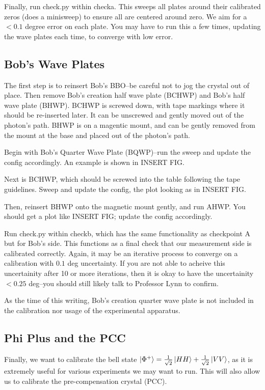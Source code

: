 \documentclass{paper}[11pt]
\begin{document}
Finally, run check.py within checka. This sweeps all plates around their calibrated zeros (does a minisweep) to ensure all are centered around zero. We aim for a $< 0.1$ degree error on each plate. You may have to run this a few times, updating the wave plates each time, to converge with low error. 

\subsection{Bob's Wave Plates}
The first step is to reinsert Bob's BBO--be careful not to jog the crystal out of place. Then remove Bob's creation half wave plate (BCHWP) and Bob's half wave plate (BHWP). BCHWP is screwed down, with tape markings where it should be re-inserted later. It can be unscrewed and gently moved out of the photon's path. BHWP is on a magentic mount, and can be gently removed from the mount at the base and placed out of the photon's path. 

Begin with Bob's Quarter Wave Plate (BQWP)--run the sweep and update the config accordingly. An example is shown in INSERT FIG. 

Next is BCHWP, which should be screwed into the table following the tape guidelines. Sweep and update the config, the plot looking as in INSERT FIG.

Then, reinsert BHWP onto the magnetic mount gently, and run AHWP. You should get a plot like INSERT FIG; update the config accordingly. 

Run check.py within checkb, which has the same functionality as checkpoint A but for Bob's side. This functions as a final check that our measurement side is calibrated correctly. Again, it may be an iterative process to converge on a calibration with $0.1$ deg uncertainty. If you are not able to acheive this uncertainity after 10 or more iterations, then it is okay to have the uncertainity $<0.25$ deg--you should still likely talk to Professor Lynn to confirm.

As the time of this writing, Bob's creation quarter wave plate is not included in the calibration nor usage of the experimental apparatus. 

\subsection{Phi Plus and the PCC}
Finally, we want to calibrate the bell state $\ket{\Phi^+} = \frac{1}{\sqrt{2}}\ket{HH} + \frac{1}{\sqrt{2}}\ket{VV}$, as it is extremely useful for various experiments we may want to run. This will also allow us to calibrate the pre-compensation crystal (PCC).
\end{document}
